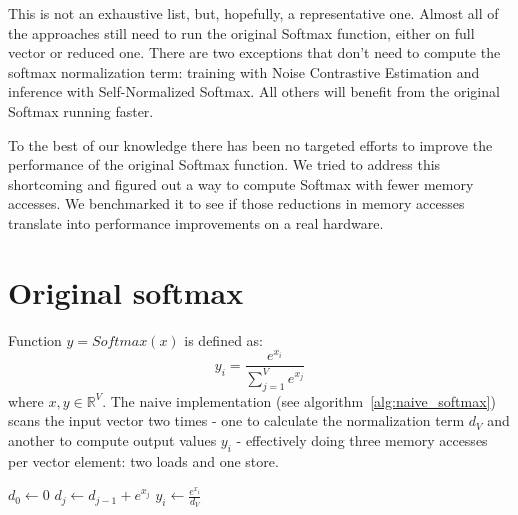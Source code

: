\documentclass{article}
\begin{document}
This is not an exhaustive list, but, hopefully, a representative one. Almost all of the approaches still need to run the original Softmax function, either on full vector or reduced one. There are two exceptions that don't need to compute the softmax normalization term: training with Noise Contrastive Estimation and inference with Self-Normalized Softmax. All others will benefit from the original Softmax running faster.

To the best of our knowledge there has been no targeted efforts to improve the performance of the original Softmax function. We tried to address this shortcoming and figured out a way to compute Softmax with fewer memory accesses. We benchmarked it to see if those reductions in memory accesses translate into performance improvements on a real hardware.

\section{Original softmax}
Function \(y=Softmax(x)\) is defined as:
\begin{equation}
\label{eq:naive_softmax}
y_i=\frac{e^{x_i}}{\sum\limits_{j=1}^{V}{e^{x_j}}}
\end{equation}
where \(x, y \in \mathbb{R}^V\). The naive implementation (see algorithm~\ref{alg:naive_softmax}) scans the input vector two times - one to calculate the normalization term $d_V$ and another to compute output values $y_i$ - effectively doing three memory accesses per vector element: two loads and one store.
\begin{algorithm}[ht]
\caption{Naive softmax}
\label{alg:naive_softmax}
\begin{algorithmic}[1]
\State $d_0\gets 0$
\State $d_j\gets d_{j-1}+e^{x_j}$ \label{overflow_line}
\EndFor
{}
\State $y_i\gets \frac{e^{x_i}}{d_V}$
\EndFor
\end{algorithmic}
\end{algorithm}
\end{document}

